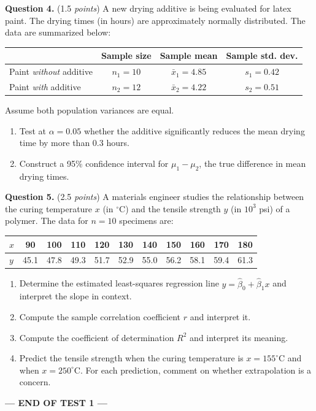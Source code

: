 \documentclass[12pt]{article}
\begin{document}
\textbf{Question 4.} (1.5 \emph{points})
A new drying additive is being evaluated for latex paint. The drying
times (in hours) are approximately normally distributed. The data are
summarized below:
\begin{center}
\begin{tabular}{lccc}
\toprule
 & Sample size & Sample mean & Sample std. dev. \\
\midrule
Paint \emph{without} additive  & $n_1 = 10$ & $\bar{x}_1 = 4.85$ & $s_1 = 0.42$ \\
Paint \emph{with} additive     & $n_2 = 12$ & $\bar{x}_2 = 4.22$ & $s_2 = 0.51$ \\
\bottomrule
\end{tabular}
\end{center}
Assume both population variances are equal.
\begin{enumerate}[label=(\alph*),leftmargin=*]
  \item Test at $\alpha = 0.05$ whether the additive significantly
        reduces the mean drying time by more than 0.3 hours.
  \item Construct a 95\% confidence interval for $\mu_1 - \mu_2$, the
        true difference in mean drying times.
\end{enumerate}

\textbf{Question 5.} (2.5 \emph{points})
A materials engineer studies the relationship between the curing
temperature $x$ (in ${}^\circ$C) and the tensile strength $y$
(in $10^3$ psi) of a polymer. The data for $n = 10$ specimens are:
\begin{center}
\begin{tabular}{l|cccccccccc}
$x$ & 90 & 100 & 110 & 120 & 130 & 140 & 150 & 160 & 170 & 180 \\ \hline
$y$ & 45.1 & 47.8 & 49.3 & 51.7 & 52.9 & 55.0 & 56.2 & 58.1 & 59.4 & 61.3 \\
\end{tabular}
\end{center}
\begin{enumerate}[label=(\alph*),leftmargin=*]
  \item Determine the estimated least-squares regression line
        $\hat{y} = \hat{\beta}_0 + \hat{\beta}_1 x$ and interpret
        the slope in context.
  \item Compute the sample correlation coefficient $r$ and interpret it.
  \item Compute the coefficient of determination $R^{2}$ and interpret
        its meaning.
  \item Predict the tensile strength when the curing temperature is
        $x = 155^\circ$C and when $x = 250^\circ$C. For each prediction,
        comment on whether extrapolation is a concern.
\end{enumerate}

\vspace{10pt}
\begin{center}
\textbf{--- END OF TEST 1 ---}
\end{center}
\end{document}
